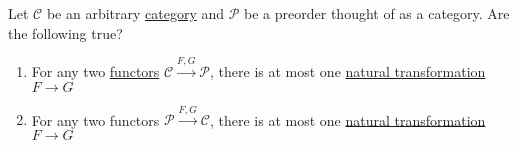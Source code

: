 Let $\mathcal{C}$ be an arbitrary \href{doc/1 math/Seven Sketches in Compositionality/Chapter 3: Databases/2 Categories/1 Free Categories/1 Category}{category} and $\mathcal{P}$ be a preorder thought of as a category. Are the following true?
    \begin{enumerate}
      \item For any two \href{doc/1 math/Seven Sketches in Compositionality/Chapter 3: Databases/3 Functors, natural transformations, and databases/2 Functors/1 Functor}{functors} $\mathcal{C}\xrightarrow{F,G}\mathcal{P}$, there is at most one \href{doc/1 math/Seven Sketches in Compositionality/Chapter 3: Databases/3 Functors, natural transformations, and databases/4 Natural transformations/1 Natural transformation}{natural transformation} $F \rightarrow G$
      \item  For any two functors $\mathcal{P}\xrightarrow{F,G}\mathcal{C}$, there is at most one \href{doc/1 math/Seven Sketches in Compositionality/Chapter 3: Databases/3 Functors, natural transformations, and databases/4 Natural transformations/1 Natural transformation}{natural transformation} $F \rightarrow G$
    \end{enumerate}